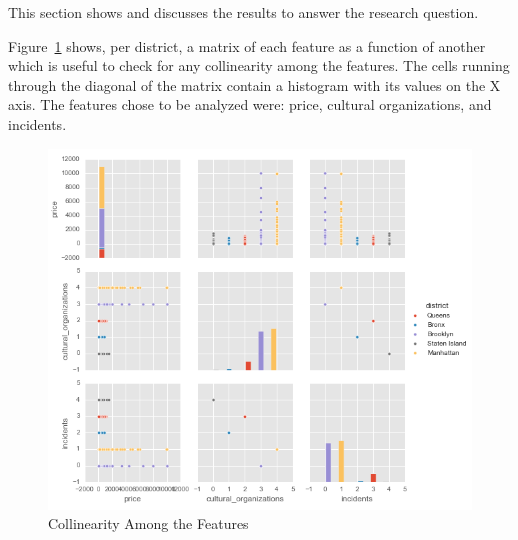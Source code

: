 \documentclass[sigconf]{acmart}
\begin{document}
This section shows and discusses the results to answer the research question.

Figure~\ref{fig:pairwiserelationsprincipalfeatures} shows, per district, a matrix of each feature as a function of another which is useful to check for any collinearity among the features. The cells running through the diagonal of the matrix contain a histogram with its values on the X axis. The features chose to be analyzed were: price, cultural organizations, and incidents.

\begin{figure}[!htpb]
	\centering
	\includegraphics[width=\linewidth]{images/related_data2}
	\caption{Collinearity Among the Features}
	\label{fig:pairwiserelationsprincipalfeatures}
\end{figure}

\end{document}
